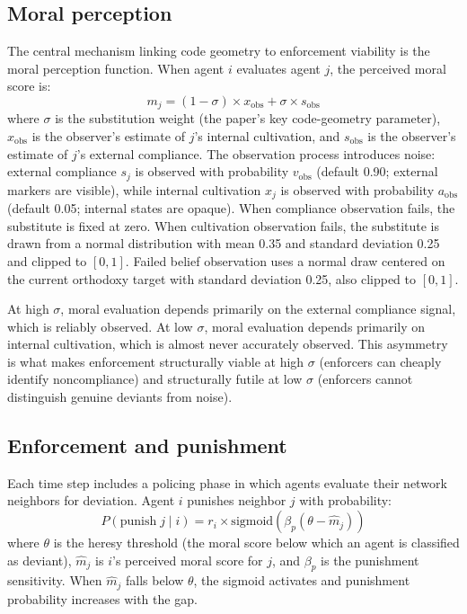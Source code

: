 \documentclass[12pt]{article}
\begin{document}
\subsection{Moral perception}

The central mechanism linking code geometry to enforcement viability is the moral perception function. When agent $i$ evaluates agent $j$, the perceived moral score is:
\[
m_j = (1 - \sigma) \times x_{\text{obs}} + \sigma \times s_{\text{obs}}
\]
where $\sigma$ is the substitution weight (the paper's key code-geometry parameter), $x_{\text{obs}}$ is the observer's estimate of $j$'s internal cultivation, and $s_{\text{obs}}$ is the observer's estimate of $j$'s external compliance. The observation process introduces noise: external compliance $s_j$ is observed with probability $v_{\text{obs}}$ (default 0.90; external markers are visible), while internal cultivation $x_j$ is observed with probability $a_{\text{obs}}$ (default 0.05; internal states are opaque). When compliance observation fails, the substitute is fixed at zero. When cultivation observation fails, the substitute is drawn from a normal distribution with mean 0.35 and standard deviation 0.25 and clipped to $[0,1]$. Failed belief observation uses a normal draw centered on the current orthodoxy target with standard deviation 0.25, also clipped to $[0,1]$.

At high $\sigma$, moral evaluation depends primarily on the external compliance signal, which is reliably observed. At low $\sigma$, moral evaluation depends primarily on internal cultivation, which is almost never accurately observed. This asymmetry is what makes enforcement structurally viable at high $\sigma$ (enforcers can cheaply identify noncompliance) and structurally futile at low $\sigma$ (enforcers cannot distinguish genuine deviants from noise).

\subsection{Enforcement and punishment}

Each time step includes a policing phase in which agents evaluate their network neighbors for deviation. Agent $i$ punishes neighbor $j$ with probability:
\[
P(\text{punish}\; j \mid i) = r_i \times \text{sigmoid}(\beta_p(\theta - \hat{m}_j))
\]
where $\theta$ is the heresy threshold (the moral score below which an agent is classified as deviant), $\hat{m}_j$ is $i$'s perceived moral score for $j$, and $\beta_p$ is the punishment sensitivity. When $\hat{m}_j$ falls below $\theta$, the sigmoid activates and punishment probability increases with the gap.
\end{document}
